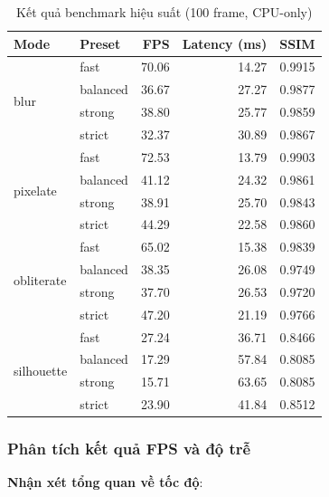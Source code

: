 \begin{table}[H]
\centering
\caption{Kết quả benchmark hiệu suất (100 frame, CPU-only)}
\label{tab:benchmark_full}
\begin{tabular}{|l|l|r|r|r|}
\hline
\textbf{Mode} & \textbf{Preset} & \textbf{FPS} & \textbf{Latency (ms)} & \textbf{SSIM} \\
\hline
\multirow{4}{*}{blur} 
& fast     & 70.06 & 14.27 & 0.9915 \\
& balanced & 36.67 & 27.27 & 0.9877 \\
& strong   & 38.80 & 25.77 & 0.9859 \\
& strict   & 32.37 & 30.89 & 0.9867 \\
\hline
\multirow{4}{*}{pixelate}
& fast     & 72.53 & 13.79 & 0.9903 \\
& balanced & 41.12 & 24.32 & 0.9861 \\
& strong   & 38.91 & 25.70 & 0.9843 \\
& strict   & 44.29 & 22.58 & 0.9860 \\
\hline
\multirow{4}{*}{obliterate}
& fast     & 65.02 & 15.38 & 0.9839 \\
& balanced & 38.35 & 26.08 & 0.9749 \\
& strong   & 37.70 & 26.53 & 0.9720 \\
& strict   & 47.20 & 21.19 & 0.9766 \\
\hline
\multirow{4}{*}{silhouette}
& fast     & 27.24 & 36.71 & 0.8466 \\
& balanced & 17.29 & 57.84 & 0.8085 \\
& strong   & 15.71 & 63.65 & 0.8085 \\
& strict   & 23.90 & 41.84 & 0.8512 \\
\hline
\end{tabular}
\end{table}

\subsubsection{Phân tích kết quả FPS và độ trễ}

\textbf{Nhận xét tổng quan về tốc độ}:

